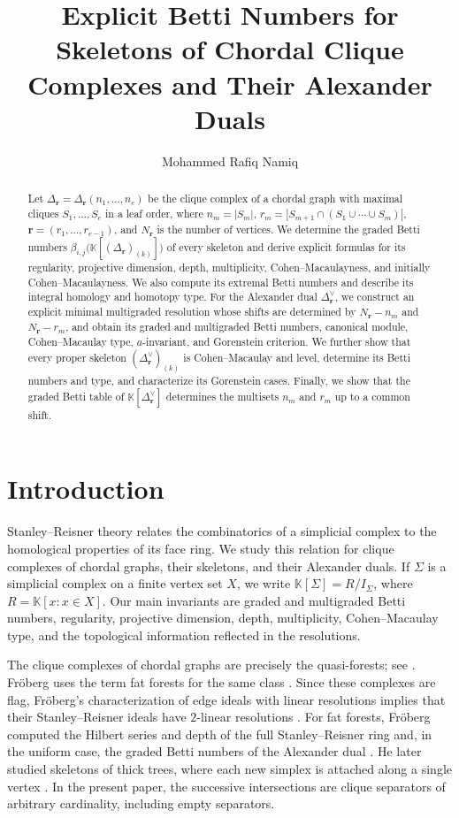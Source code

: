 \documentclass[11pt]{amsart}
\title[Betti Numbers for Skeletons of Chordal Clique Complexes]{Explicit Betti Numbers for Skeletons of Chordal Clique Complexes and Their Alexander Duals}
\author{Mohammed Rafiq Namiq}
\theoremstyle{definition}
\theoremstyle{remark}
\newcommand{\K}{\mathbb K}
\newcommand{\SR}[1]{\K[#1]}
\begin{document}
	\begin{abstract}
		Let $\Delta_{\mathbf r}=\Delta_{\mathbf r}(n_1,\ldots,n_e)$ be the clique complex of a chordal graph with maximal cliques $S_1,\ldots,S_e$ in a leaf order, where $n_m=|S_m|$, $r_m=|S_{m+1}\cap(S_1\cup\cdots\cup S_m)|$, $\mathbf r=(r_1,\ldots,r_{e-1})$, and $N_{\mathbf r}$ is the number of vertices. We determine the graded Betti numbers $\beta_{i,j}\bigl(\mathbb K[(\Delta_{\mathbf r})_{(k)}]\bigr)$ of every skeleton and derive explicit formulas for its regularity, projective dimension, depth, multiplicity, Cohen--Macaulayness, and initially Cohen--Macaulayness. We also compute its extremal Betti numbers and describe its integral homology and homotopy type. For the Alexander dual $\Delta_{\mathbf r}^{\vee}$, we construct an explicit minimal multigraded resolution whose shifts are determined by $N_{\mathbf r}-n_m$ and $N_{\mathbf r}-r_m$, and obtain its graded and multigraded Betti numbers, canonical module, Cohen--Macaulay type, $a$-invariant, and Gorenstein criterion. We further show that every proper skeleton $(\Delta_{\mathbf r}^{\vee})_{(k)}$ is Cohen--Macaulay and level, determine its Betti numbers and type, and characterize its Gorenstein cases. Finally, we show that the graded Betti table of $\mathbb K[\Delta_{\mathbf r}^{\vee}]$ determines the multisets ${n_m}$ and ${r_m}$ up to a common shift.
	\end{abstract}
	
	\maketitle
	
	\section{Introduction}\label{sec:1}
	Stanley--Reisner theory relates the combinatorics of a simplicial complex to the homological properties of its face ring. We study this relation for clique complexes of chordal graphs, their skeletons, and their Alexander duals. If $\Sigma$ is a simplicial complex on a finite vertex set $X$, we write $\SR{\Sigma}=R/I_\Sigma$, where $R=\K[x:x\in X]$. Our main invariants are graded and multigraded Betti numbers, regularity, projective dimension, depth, multiplicity, Cohen--Macaulay type, and the topological information reflected in the resolutions.
	
	The clique complexes of chordal graphs are precisely the quasi-forests; see \cite{HHMTZ08,HHZ04}. Fr\"oberg uses the term fat forests for the same class \cite{Fr1}. Since these complexes are flag, Fr\"oberg's characterization of edge ideals with linear resolutions implies that their Stanley--Reisner ideals have $2$-linear resolutions \cite{Fr}. For fat forests, Fr\"oberg computed the Hilbert series and depth of the full Stanley--Reisner ring and, in the uniform case, the graded Betti numbers of the Alexander dual \cite{Fr1}. He later studied skeletons of thick trees, where each new simplex is attached along a single vertex \cite{Fr2}. In the present paper, the successive intersections are clique separators of arbitrary cardinality, including empty separators.
	
\end{document}
